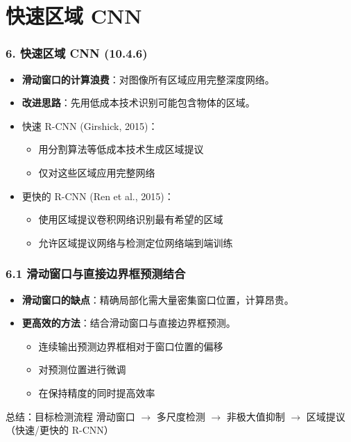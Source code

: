 \documentclass[t,aspectratio=169]{beamer} %
\begin{document}
\section{快速区域 CNN}

\begin{frame}
    \frametitle{6. 快速区域 CNN (10.4.6)}
    \begin{itemize}
        \item \textbf{滑动窗口的计算浪费}：对图像所有区域应用完整深度网络。
        \item \textbf{改进思路}：先用低成本技术识别\alert{可能包含物体的区域}。
        \item \alert{快速 R-CNN} (Girshick, 2015)：
        \begin{itemize}
            \item 用分割算法等低成本技术生成区域提议
            \item 仅对这些区域应用完整网络
        \end{itemize}
        \item \alert{更快的 R-CNN} (Ren et al., 2015)：
        \begin{itemize}
            \item 使用\alert{区域提议卷积网络}识别最有希望的区域
            \item 允许区域提议网络与检测定位网络\alert{端到端训练}
        \end{itemize}
    \end{itemize}
\end{frame}

\begin{frame}
    \frametitle{6.1 滑动窗口与直接边界框预测结合}
    \begin{itemize}
        \item \textbf{滑动窗口的缺点}：精确局部化需大量密集窗口位置，计算昂贵。
        \item \textbf{更高效的方法}：结合滑动窗口与\alert{直接边界框预测}。
        \begin{itemize}
            \item 连续输出预测边界框\alert{相对于窗口位置的偏移}
            \item 对预测位置进行\alert{微调}
            \item 在保持精度的同时提高效率
        \end{itemize}
    \end{itemize}
    \begin{block}{总结：目标检测流程}
        滑动窗口 $\to$ 多尺度检测 $\to$ 非极大值抑制 $\to$ 区域提议（快速/更快的 R-CNN）
    \end{block}
\end{frame}
\end{document}
